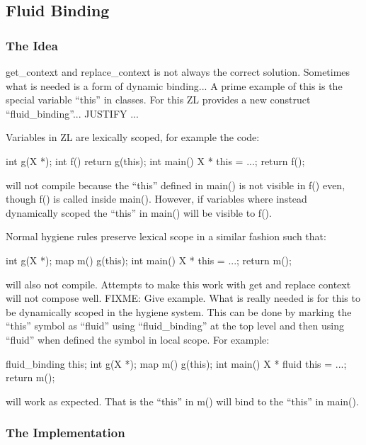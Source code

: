 \documentclass[12pt,english,letterpaper]{article}
\begin{document}
\subsection{Fluid Binding}

\subsubsection{The Idea}

get\_context and replace\_context is not always the correct solution.
Sometimes what is needed is a form of dynamic binding...  A prime
example of this is the special variable ``this'' in classes.  For this
ZL provides a new construct ``fluid\_binding''... JUSTIFY ...

Variables in ZL are lexically scoped, for example the code:

\begin{code}
int g(X *);
int f() {return g(this);}
int main() {X * this = ...; return f();}
\end{code}

will not compile because the ``this'' defined in main() is not visible in
f() even, though f() is called inside main().  However, if variables
where instead dynamically scoped the ``this'' in main() will be visible
to f().  

Normal hygiene rules preserve lexical scope in a similar fashion such that:

\begin{code}
int g(X *);
map m() {g(this);}
int main() {X * this = ...; return m();}
\end{code}

will also not compile.  Attempts to make this work with get and
replace context will not compose well.  FIXME: Give example. What is
really needed is for this to be dynamically scoped in the hygiene
system.  This can be done by marking the ``this'' symbol as ``fluid''
using ``fluid\_binding'' at the top level and then using ``fluid''
when defined the symbol in local scope.  For example:

\begin{code}
fluid_binding this;
int g(X *);
map m() {g(this);}
int main() {X * fluid this = ...; return m();}
\end{code}

will work as expected.  That is the ``this'' in m() will bind to the
``this'' in main(). 

\subsubsection{The Implementation}
\end{document}
